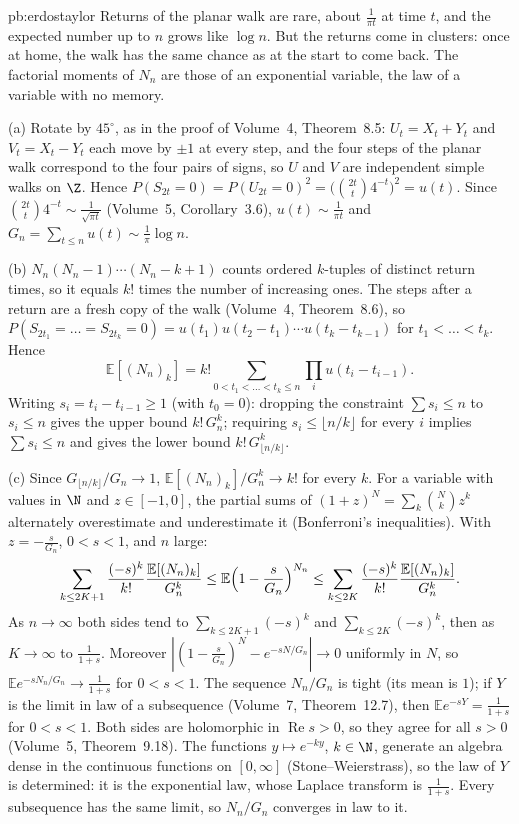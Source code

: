 \begin{solution}{pb:erdostaylor}
\idea Returns of the planar walk are rare, about $\frac1{\pi t}$ at time $t$, and the expected number up to $n$ grows like $\log n$. But the returns come in clusters:
once at home, the walk has the same chance as at the start to come back. The factorial moments of $N_n$ are those of an exponential variable, the law of a variable with
no memory.

\writeup (a) Rotate by $45^\circ$, as in the proof of Volume~4, Theorem~8.5: $U_t=X_t+Y_t$ and $V_t=X_t-Y_t$ each move by $\pm1$ at every step, and the four steps of the planar walk correspond to the four pairs of
signs, so $U$ and $V$ are independent simple walks on $\Z$. Hence $P(S_{2t}=0)=P(U_{2t}=0)^2=\bigl(\binom{2t}t4^{-t}\bigr)^2=u(t)$. Since $\binom{2t}t4^{-t}\sim\frac1{\sqrt{\pi t}}$
(Volume~5, Corollary~3.6), $u(t)\sim\frac1{\pi t}$ and $G_n=\sum_{t\le n}u(t)\sim\frac1\pi\log n$.

(b) $N_n(N_n-1)\cdots(N_n-k+1)$ counts ordered $k$-tuples of distinct return times, so it equals $k!$ times the number of increasing ones. The steps after a return are a fresh copy of the walk (Volume~4, Theorem~8.6), so
$P(S_{2t_1}=\dots=S_{2t_k}=0)=u(t_1)u(t_2-t_1)\cdots u(t_k-t_{k-1})$ for $t_1<\dots<t_k$. Hence
\[
\mathbb E[(N_n)_k]=k!\sum_{0<t_1<\dots<t_k\le n}\prod_{i}u(t_i-t_{i-1}).
\]
Writing $s_i=t_i-t_{i-1}\ge1$ (with $t_0=0$): dropping the constraint $\sum s_i\le n$ to $s_i\le n$ gives the upper bound $k!\,G_n^k$; requiring $s_i\le\lfloor n/k\rfloor$ for every $i$
implies $\sum s_i\le n$ and gives the lower bound $k!\,G_{\lfloor n/k\rfloor}^k$.

(c) Since $G_{\lfloor n/k\rfloor}/G_n\to1$, $\mathbb E[(N_n)_k]/G_n^k\to k!$ for every $k$. For a variable with values in $\N$ and $z\in[-1,0]$, the partial sums of
$(1+z)^N=\sum_k\binom Nkz^k$ alternately overestimate and underestimate it (Bonferroni's inequalities). With $z=-\frac s{G_n}$, $0<s<1$, and $n$ large:
\[
\sum_{k\le2K+1}\frac{(-s)^k}{k!}\frac{\mathbb E[(N_n)_k]}{G_n^k}\le\mathbb E\Bigl(1-\frac s{G_n}\Bigr)^{N_n}\le\sum_{k\le2K}\frac{(-s)^k}{k!}\frac{\mathbb E[(N_n)_k]}{G_n^k}.
\]
As $n\to\infty$ both sides tend to $\sum_{k\le2K+1}(-s)^k$ and $\sum_{k\le2K}(-s)^k$, then as $K\to\infty$ to $\frac1{1+s}$. Moreover $|(1-\frac s{G_n})^{N}-e^{-sN/G_n}|\to0$
uniformly in $N$, so $\mathbb Ee^{-sN_n/G_n}\to\frac1{1+s}$ for $0<s<1$. The sequence $N_n/G_n$ is tight (its mean is $1$); if $Y$ is the limit in law of a subsequence (Volume~7,
Theorem~12.7), then $\mathbb Ee^{-sY}=\frac1{1+s}$ for $0<s<1$. Both sides are holomorphic in $\operatorname{Re}s>0$, so they agree for all $s>0$ (Volume~5, Theorem~9.18). The
functions $y\mapsto e^{-ky}$, $k\in\N$, generate an algebra dense in the continuous functions on $[0,\infty]$ (Stone--Weierstrass), so the law of $Y$ is determined:
it is the exponential law, whose Laplace transform is $\frac1{1+s}$. Every subsequence has the same limit, so $N_n/G_n$ converges in law to it.


\end{solution}
